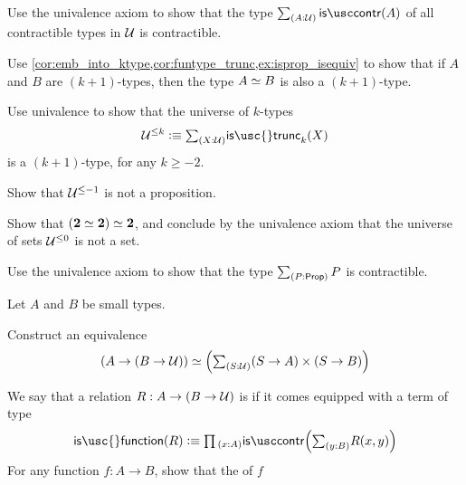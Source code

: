 \begin{exercises}
\item \label{ex:istrunc_UUtrunc}
\begin{subexenum}
\item Use the univalence axiom to show that the type $\sm{A:\UU}\iscontr(A)$ of all contractible types in $\mathcal{U}$ is contractible.
\item Use \cref{cor:emb_into_ktype,cor:funtype_trunc,ex:isprop_isequiv} to show that if $A$ and $B$ are $(k+1)$-types, then the type $\eqv{A}{B}$ is also a $(k+1)$-type.
\item Use univalence to show that the universe of $k$-types
\begin{equation*}
\UU^{\leq k}\defeq \sm{X:\UU}\mathsf{is\usc{}trunc}_k(X)
\end{equation*}
is a $(k+1)$-type, for any $k\geq -2$.
\item Show that $\mathcal{U}^{\leq-1}$ is not a proposition.
\item Show that $\eqv{(\eqv{\bool}{\bool})}{\bool}$, and conclude by the univalence axiom that the universe of sets $\mathcal{U}^{\leq 0}$ is not a set. 
\end{subexenum}
\item Use the univalence axiom to show that the type $\sm{P:\prop}P$ is contractible.
\item Let $A$ and $B$ be small types. 
\begin{subexenum}
\item Construct an equivalence
\begin{equation*}
\eqv{(A\to (B\to\UU))}{\Big(\sm{S:\UU} (S\to A)\times (S\to B)\Big)}
\end{equation*}
\item We say that a relation $R:A\to (B\to\mathcal{U})$ is  if it comes equipped with a term of type
\begin{equation*}
\mathsf{is\usc{}function}(R) \defeq \prd{x:A}\iscontr\Big(\sm{y:B}R(x,y)\Big)
\end{equation*}
For any function $f:A\to B$, show that the  of $f$ 
\begin{equation*}

\end{equation*}
\end{subexenum}
\end{exercises}
